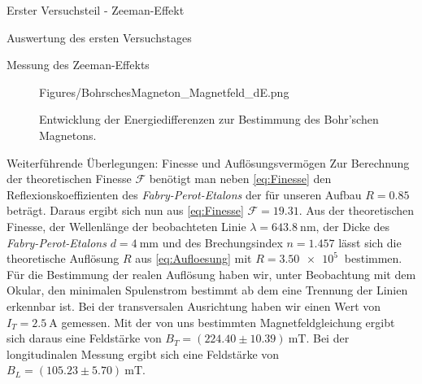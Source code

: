 \documentclass[pdftex, a4paper,11pt, twoside, ngerman]{report}
\begin{document}
\begin{chapter}{Erster Versuchsteil - Zeeman-Effekt}
\begin{section}{Auswertung des ersten Versuchstages}
\begin{subsection}{Messung des Zeeman-Effekts}
\begin{figure}[ht]
              {Figures/BohrschesMagneton_Magnetfeld_dE.png}
          \caption{Entwicklung der Energiedifferenzen zur Bestimmung des
              Bohr'schen Magnetons.}
          \label{fig:BohrschesMagneton}
        \end{figure}
        
      \end{subsection}
      
      
      
      \begin{subsection}
      {Weiterführende Überlegungen: Finesse und Auflösungsvermögen}
        \label{chp:Zeeman:sec:AuswertungWeiteres}
        Zur Berechnung der theoretischen Finesse $\mathcal{F}$ benötigt man
        neben \cref{eq:Finesse} den Reflexionskoeffizienten des 
        \textit{Fabry-Perot-Etalons} der für unseren Aufbau $R=0.85$ beträgt.
        Daraus ergibt sich nun aus \cref{eq:Finesse} $\mathcal{F}=19.31$.
        Aus der theoretischen Finesse, der Wellenlänge der beobachteten Linie
        $\lambda=\SI{643.8}{\nano\meter}$, der Dicke des
        \textit{Fabry-Perot-Etalons} $d=\SI{4}{\milli\meter}$ und des
        Brechungsindex $n=1.457$ lässt sich die theoretische Auflösung $R$ aus
        \cref{eq:Aufloesung} mit $R=\SI{3.50e5}{}$ bestimmen. \newline
        Für die Bestimmung der realen Auflösung haben wir, unter Beobachtung
        mit dem Okular, den minimalen Spulenstrom bestimmt ab dem eine Trennung
        der Linien erkennbar ist. Bei der transversalen Ausrichtung haben wir
        einen Wert von $I_T=\SI{2.5}{\ampere}$ gemessen. Mit der von uns
        bestimmten Magnetfeldgleichung ergibt sich daraus eine Feldstärke von
        $B_T=(224.40\pm 10.39)\SI{}{\milli\tesla}$. Bei der longitudinalen
        Messung ergibt sich eine Feldstärke von 
        $B_L=(105.23\pm 5.70)\SI{}{\milli\tesla}$. 
        
      \end{subsection}
      
    \end{section}
    
    
    

\end{chapter}
\end{document}
